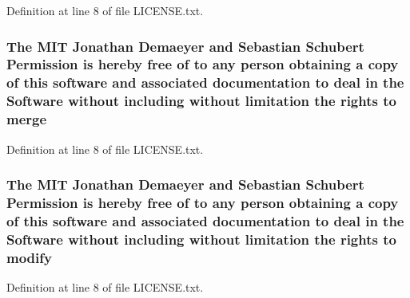 Definition at line 8 of file L\+I\+C\+E\+N\+S\+E.\+txt.

\subsubsection[{\texorpdfstring{merge}{merge}}]{\setlength{\rightskip}{0pt plus 5cm}The M\+IT Jonathan Demaeyer and Sebastian Schubert Permission is hereby free of to any person obtaining a {\bf copy} of this software and associated documentation to deal in the {\bf Software} without including without limitation the rights to merge}\hypertarget{LICENSE_8txt_a581681f5201fdd4632f6b981d27e5234}{}\label{LICENSE_8txt_a581681f5201fdd4632f6b981d27e5234}


Definition at line 8 of file L\+I\+C\+E\+N\+S\+E.\+txt.

\subsubsection[{\texorpdfstring{modify}{modify}}]{\setlength{\rightskip}{0pt plus 5cm}The M\+IT Jonathan Demaeyer and Sebastian Schubert Permission is hereby free of to any person obtaining a {\bf copy} of this software and associated documentation to deal in the {\bf Software} without including without limitation the rights to modify}\hypertarget{LICENSE_8txt_a052fb1278b9c5ca8859c1b9d4f7807a0}{}\label{LICENSE_8txt_a052fb1278b9c5ca8859c1b9d4f7807a0}


Definition at line 8 of file L\+I\+C\+E\+N\+S\+E.\+txt.

